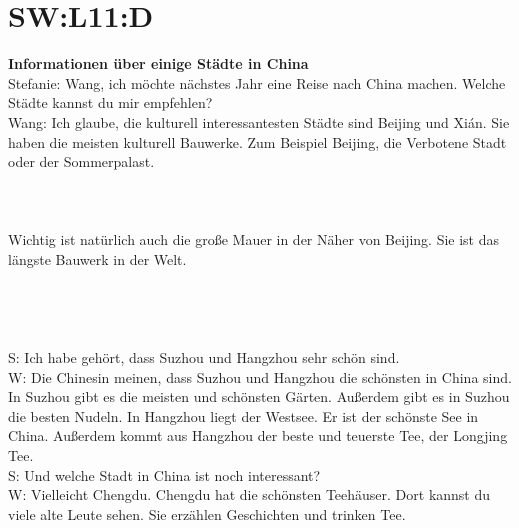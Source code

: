 \section{SW:L11:D}
\noindent
\textbf{Informationen über einige Städte in China} \\
Stefanie: Wang, ich möchte nächstes Jahr eine Reise nach China machen.
Welche Städte kannst du mir empfehlen? \\
Wang: Ich glaube, die kulturell interessantesten Städte sind Beijing und Xi\'an. 
Sie haben die meisten kulturell Bauwerke. 
Zum Beispiel Beijing, die Verbotene Stadt oder der Sommerpalast.  \\
\\
\\
\\
\noindent
Wichtig ist natürlich auch die große Mauer in der Näher von Beijing.  Sie ist das längste Bauwerk in der Welt. \\
\\
\\
\\
\\
\noindent
S: Ich habe gehört, dass Suzhou und Hangzhou sehr schön sind. \\
W: Die Chinesin meinen,  dass Suzhou und Hangzhou die schönsten in China sind.
In Suzhou gibt es die meisten und schönsten Gärten. Außerdem gibt es in Suzhou die besten Nudeln. 
In Hangzhou liegt der Westsee. Er ist der schönste See in China.
Außerdem kommt aus Hangzhou der beste und teuerste Tee, der Longjing Tee. \\
S: Und welche Stadt in China ist noch interessant? \\
W: Vielleicht Chengdu. Chengdu hat die schönsten Teehäuser.
Dort kannst du viele alte Leute sehen. Sie erzählen Geschichten und trinken Tee. \\
